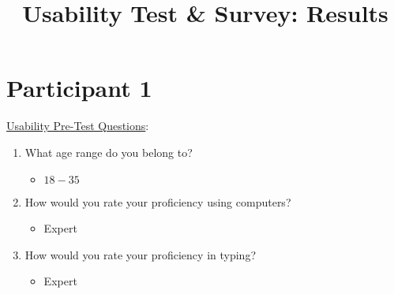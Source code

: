 \documentclass[12pt]{article}
\begin{document}
\date{}
\title{Usability Test \& Survey: Results}
\maketitle

\section{Participant 1}
\underline{Usability Pre-Test Questions}:
\begin{enumerate}
  \item What age range do you belong to?
    \begin{itemize}
      \item $18 - 35$
    \end{itemize}
	\item How would you rate your proficiency using computers?
    \begin{itemize}
      \item Expert
    \end{itemize}
  \item How would you rate your proficiency in typing?
    \begin{itemize}
      \item Expert
    \end{itemize}
\end{enumerate}
\end{document}
